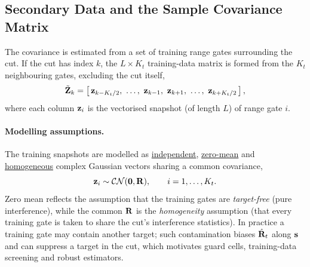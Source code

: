 \documentclass{article}
\begin{document}
\subsection{Secondary Data and the Sample Covariance Matrix}
\label{sec:scm}
The covariance is estimated from a set of training range gates surrounding the \gls{cut}. If the \gls{cut} has index $k$, the $L\times K_t$ training-data matrix is formed from the $K_t$ neighbouring gates, excluding the \gls{cut} itself, $$\tilde{\m Z}_k = \left[\,\vb z_{k-K_t/2},\ \ldots,\ \vb z_{k-1},\ \vb z_{k+1},\
   \ldots,\ \vb z_{k+K_t/2}\,\right],$$
where each column $\vb z_i$ is the vectorised snapshot (of length $L$) of range gate $i$.

\paragraph{Modelling assumptions.}
The training snapshots are modelled as \underline{independent}, \underline{zero-mean} and \underline{homogeneous} complex Gaussian vectors sharing a common covariance,
$$\vb z_i \sim \mathcal{CN}(\vb 0,\mathbf{R}), \qquad i=1,\ldots,K_t.$$ 
Zero mean reflects the assumption that the training gates are \emph{target-free} (pure interference), while the common $\mathbf{R}$ is the \emph{homogeneity} assumption (that every training gate is taken to share the \gls{cut}'s interference statistics). In practice a training gate may contain another target; such contamination biases $\hat{\mathbf{R}}_t$ along $\vb s$ and can suppress a target in the \gls{cut}, which motivates guard cells, training-data screening and robust estimators.
\end{document}
